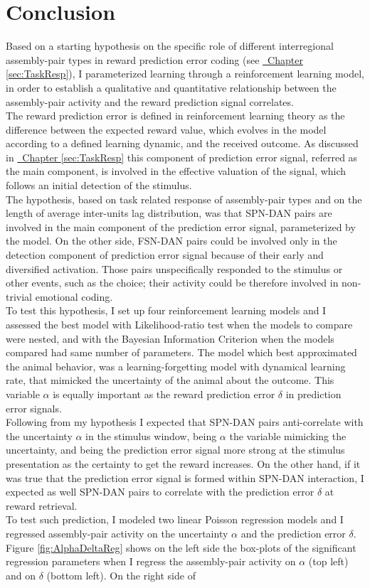 \section{Conclusion}
\label{sec:concRL}
Based on a starting hypothesis on the specific role of different interregional assembly-pair types in reward prediction error coding (see \hyperref[sec:TaskResp]{~Chapter \ref*{sec:TaskResp}}), I parameterized learning through a reinforcement learning model, in order to establish a qualitative and quantitative relationship between the assembly-pair activity and the reward prediction signal correlates.\\The reward prediction error is defined in reinforcement learning theory as the difference between the expected reward value, which evolves in the model according to a defined learning dynamic, and the received outcome. As discussed in \hyperref[sec:TaskResp]{~Chapter \ref*{sec:TaskResp}} this component of prediction error signal, referred as the main component, is involved in the effective valuation of the signal, which follows an initial detection of the stimulus.\\The hypothesis, based on task related response of assembly-pair types and on the length of average inter-units lag distribution, was that SPN-DAN pairs are involved in the main component of the prediction error signal, parameterized by the model. On the other side, FSN-DAN pairs could be involved only in the detection component of prediction error signal because of their early and diversified activation. Those pairs unspecifically responded to the stimulus or other events, such as the choice; their activity could be therefore involved in non-trivial emotional coding.\\To test this hypothesis, I set up four reinforcement learning models and I assessed the best model with Likelihood-ratio test when the models to compare were nested, and with the Bayesian Information Criterion when the models compared had same number of parameters. The model which best approximated the animal behavior, was a learning-forgetting model with dynamical learning rate, that mimicked the uncertainty of the animal about the outcome. This variable $\alpha$ is equally important as the reward prediction error $\delta$ in prediction error signals.\\Following from my hypothesis I expected that SPN-DAN pairs anti-correlate with the uncertainty $\alpha$ in the stimulus window, being $\alpha$ the variable mimicking the uncertainty, and being the prediction error signal more strong at the stimulus presentation as the certainty to get the reward increases. On the other hand, if it was true that the prediction error signal is formed within SPN-DAN interaction, I expected as well SPN-DAN pairs to correlate with the prediction error $\delta$ at reward retrieval.\\To test such prediction, I modeled two linear Poisson regression models and I regressed assembly-pair activity on the uncertainty $\alpha$ and the prediction error $\delta$. Figure \ref{fig:AlphaDeltaReg} shows on the left side the box-plots of the significant regression parameters when I regress the assembly-pair activity on $\alpha$ (top left) and on $\delta$ (bottom left). On the right side of 